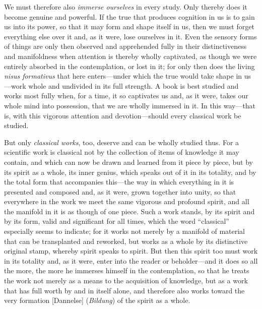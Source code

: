 \documentclass[12pt,a4paper]{book}
\begin{document}
We must therefore also \emph{immerse ourselves} in every study. Only thereby
does it become genuine and powerful. If the true that produces cognition in us
is to gain us into its power, so that it may form and shape itself in us, then
we must forget everything else over it and, as it were, lose ourselves in it.
Even the sensory forms of things are only then observed and apprehended fully in
their distinctiveness and manifoldness when attention is thereby wholly
captivated, as though we were entirely absorbed in the contemplation, or lost in
it; for only then does the living \textit{nisus formativus} that here
enters---under which the true would take shape in us---work whole and undivided
in its full strength. A book is best studied and works most fully when, for a
time, it so captivates us and, as it were, takes our whole mind into possession,
that we are wholly immersed in it. In this way---that is, with this vigorous
attention and devotion---should every classical work be studied.

But only \emph{classical works}, too, deserve and can be wholly studied thus.
For a scientific work is classical not by the collection of items of knowledge
it may contain, and which can now be drawn and learned from it piece by piece,
but by its spirit as a whole, its inner genius, which speaks out of it in its
totality, and by the total form that accompanies this---the way in which
everything in it is presented and composed and, as it were, grown together into
unity, so that everywhere in the work we meet the same vigorous and profound
spirit, and all the manifold in it is as though of one piece. Such a work
stands, by its spirit and by its form, valid and significant for all times,
which the word ``classical'' especially seems to indicate; for it works not
merely by a manifold of material that can be transplanted and reworked, but
works as a whole by its distinctive original stamp, whereby spirit speaks to
spirit. But then this spirit too must work in its totality and, as it were,
enter into the reader or beholder---and it does so all the more, the more he
immerses himself in the contemplation, so that he treats the work not merely as
a means to the acquisition of knowledge, but as a work that has full worth by
and in itself alone, and therefore also works toward the very formation
[Dannelse] (\textit{Bildung}) of the spirit as a whole.
\end{document}
